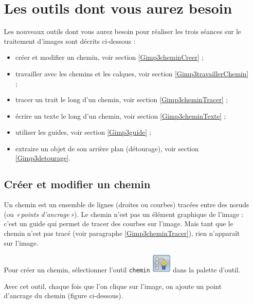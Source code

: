 \section{Les outils dont vous aurez besoin}\label{Image4eOutils}
 
Les nouveaux outils dont vous aurez besoin pour réaliser les trois séances sur le traitement d'images sont décrits ci-dessous :

\begin{itemize}
\item créer et modifier un chemin, voir section \vref{Gimp3cheminCreer} ;
\item travailler avec les chemins et les calques, voir section \vref{Gimp3travaillerChemin} ; 
\item tracer un trait le long d'un chemin, voir section \vref{Gimp3cheminTracer} ;
\item écrire un texte le long d'un chemin, voir section \vref{Gimp3cheminTexte} ;
\item utiliser les guides, voir section \vref{Gimp3guide} ;
\item extraire un objet de son arrière plan (détourage), voir section \vref{Gimp3detourage}.
\end{itemize}  


\subsection{Créer et modifier un chemin}\label{Gimp3cheminCreer} 

Un chemin est un ensemble de lignes (droites ou courbes) tracées entre des nœuds (ou \emph{«\,points d'ancrage\,»}). Le chemin n'est pas un élément graphique de l'image : c'est un guide qui permet de tracer des courbes sur l'image. Mais tant que le chemin n'est pas tracé (voir paragraphe \vref{Gimp3cheminTracer}), rien n'apparaît sur l'image. 

Pour créer un chemin, sélectionner l'outil \texttt{chemin} \includegraphics[width=1cm]{./images/image03/Chemin01} dans la palette d'outil.

Avec cet outil, chaque fois que l'on clique sur l'image, on ajoute un point d'ancrage du chemin (figure ci-dessous).



